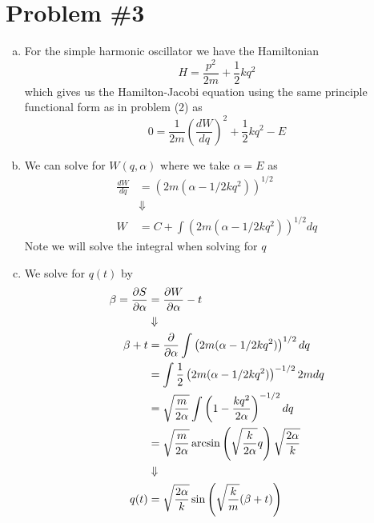 \documentclass[11pt]{article}
\numberwithin{equation}{section}
\begin{document}
\section{Problem \#3}
\begin{enumerate}[(a)]
\item For the simple harmonic oscillator we have the Hamiltonian
$$H = \frac{p^2}{2m}+\frac{1}{2}kq^2$$
which gives us the Hamilton-Jacobi equation using the same principle functional form as in
problem (2) as
$$0 = \frac{1}{2m}\left(\frac{dW}{dq}\right)^2 + \frac{1}{2}kq^2 - E$$

\item
We can solve for $W(q,\alpha)$ where we take $\alpha=E$ as
\begin{align*}
\frac{dW}{dq} &= \left(2m(\alpha-1/2kq^2)\right)^{1/2}\\
&\Downarrow\\
W &= C + \int\left(2m(\alpha-1/2kq^2)\right)^{1/2}dq
\end{align*}
Note we will solve the integral when solving for $q$

\item We solve for $q(t)$ by
\begin{align*}
\beta = \frac{\partial{S}}{\partial{\alpha}} &= \frac{\partial{W}}{\partial{\alpha}} - t\\
&\Downarrow\\
\beta + t &= \frac{\partial{}}{\partial{\alpha}}\int\left(2m(\alpha-1/2kq^2)\right)^{1/2}dq\\
&= \int\frac{1}{2}\left(2m(\alpha-1/2kq^2)\right)^{-1/2}2mdq\\
&= \sqrt{\frac{m}{2\alpha}}\int\left(1-\frac{kq^2}{2\alpha}\right)^{-1/2}dq\\
&= \sqrt{\frac{m}{2\alpha}}\arcsin\left(\sqrt{\frac{k}{2\alpha}}q\right)\sqrt{\frac{2\alpha}{k}}\\
&\Downarrow\\
q(t) &= \sqrt{\frac{2\alpha}{k}}\sin\left(\sqrt{\frac{k}{m}}(\beta+t)\right)
\end{align*}


\end{enumerate}
\end{document}
